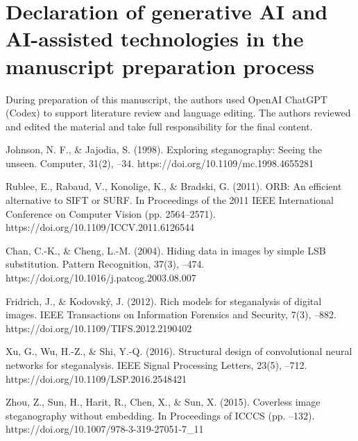 \documentclass[preprint,12pt]{elsarticle}
\theoremstyle{plain}
\providecommand{\DIFaddtex}[1]{{\protect\color{blue} \sf #1}} %
\providecommand{\DIFdeltex}[1]{{\protect\color{red} \scriptsize #1}} %
\providecommand{\DIFaddbegin}{} %
\providecommand{\DIFaddend}{} %
\providecommand{\DIFdelbegin}{} %
\providecommand{\DIFdelend}{} %
\providecommand{\DIFadd}[1]{\texorpdfstring{\DIFaddtex{#1}}{#1}} %
\providecommand{\DIFdel}[1]{\texorpdfstring{\DIFdeltex{#1}}{}} %
\providecommand{\DIFscaledelfig}{0.5}
\newlength{\DIFdelgraphicswidth} %
\newlength{\DIFdelgraphicsheight} %
\providecommand{\DIFaddincludegraphics}[2][]{{\color{blue}\fbox{\DIFOincludegraphics[#1]{#2}}}} %
\providecommand{\DIFdelincludegraphics}[2][]{%
\sbox{\DIFdelgraphicsbox}{\DIFOincludegraphics[#1]{#2}}%
\settoboxwidth{\DIFdelgraphicswidth}{\DIFdelgraphicsbox} %
\settoboxtotalheight{\DIFdelgraphicsheight}{\DIFdelgraphicsbox} %
\scalebox{\DIFscaledelfig}{%
\parbox[b]{\DIFdelgraphicswidth}{\usebox{\DIFdelgraphicsbox}\\[-\baselineskip] \rule{\DIFdelgraphicswidth}{0em}}\llap{\resizebox{\DIFdelgraphicswidth}{\DIFdelgraphicsheight}{%
\setlength{\unitlength}{\DIFdelgraphicswidth}%
\begin{picture}(1,1)%
\thicklines\linethickness{2pt} %
{\color[rgb]{1,0,0}\put(0,0){\framebox(1,1){}}}%
{\color[rgb]{1,0,0}\put(0,0){\line( 1,1){1}}}%
{\color[rgb]{1,0,0}\put(0,1){\line(1,-1){1}}}%
\end{picture}%
}\hspace*{3pt}}} %
} %
\DeclareRobustCommand{\DIFaddbegin}{\DIFOaddbegin \let\includegraphics\DIFaddincludegraphics} %
\DeclareRobustCommand{\DIFaddend}{\DIFOaddend \let\includegraphics\DIFOincludegraphics} %
\DeclareRobustCommand{\DIFdelbegin}{\DIFOdelbegin \let\includegraphics\DIFdelincludegraphics} %
\DeclareRobustCommand{\DIFdelend}{\DIFOaddend \let\includegraphics\DIFOincludegraphics} %
\renewcommand{\DIFdel}[1]{}
\renewcommand{\DIFdelincludegraphics}[2][]{}
\begin{document}
\section*{Declaration of generative AI and AI-assisted technologies in the manuscript preparation process}
During preparation of this manuscript, the authors used OpenAI ChatGPT (Codex) to support literature review \DIFdelbegin \DIFdel{, organize reviewer-driven revisions, and refine manuscript structure and language }\DIFdelend \DIFaddbegin \DIFadd{and language editing}\DIFaddend . The authors reviewed and edited the material and take full responsibility for the final content.
\begin{thebibliography}{28}

Johnson, N. F., \& Jajodia, S. (1998). Exploring steganography: Seeing the unseen. Computer, 31(2), \DIFdelbegin \DIFdel{26â€“34. }\DIFdelend \DIFaddbegin \DIFadd{26--34. }\DIFaddend https://doi.org/10.1109/mc.1998.4655281

Rublee, E., Rabaud, V., Konolige, K., \& Bradski, G. (2011). ORB: An efficient alternative to SIFT or SURF. In Proceedings of the 2011 IEEE International Conference on Computer Vision (pp. 2564--2571). https://doi.org/10.1109/ICCV.2011.6126544

Chan, C.-K., \& Cheng, L.-M. (2004). Hiding data in images by simple LSB substitution. Pattern Recognition, 37(3), \DIFdelbegin \DIFdel{469â€“474. }\DIFdelend \DIFaddbegin \DIFadd{469--474. }\DIFaddend https://doi.org/10.1016/j.patcog.2003.08.007

Fridrich, J., \& \DIFdelbegin \DIFdel{KodovskÃ}\DIFdelend \DIFaddbegin \DIFadd{Kodovský}\DIFaddend , J. (2012). Rich models for steganalysis of digital images. IEEE Transactions on Information Forensics and Security, 7(3), \DIFdelbegin \DIFdel{868â€“882. }\DIFdelend \DIFaddbegin \DIFadd{868--882. }\DIFaddend https://doi.org/10.1109/TIFS.2012.2190402

Xu, G., Wu, H.-Z., \& Shi, Y.-Q. (2016). Structural design of convolutional neural networks for steganalysis. IEEE Signal Processing Letters, 23(5), \DIFdelbegin \DIFdel{708â€“712. }\DIFdelend \DIFaddbegin \DIFadd{708--712. }\DIFaddend https://doi.org/10.1109/LSP.2016.2548421

Zhou, Z., Sun, H., Harit, R., Chen, X., \& Sun, X. (2015). Coverless image steganography without embedding. In Proceedings of ICCCS (pp. \DIFdelbegin \DIFdel{123â€“132}\DIFdelend \DIFaddbegin \DIFadd{123--132}\DIFaddend ). https://doi.org/10.1007/978-3-319-27051-7\_11


\end{thebibliography}
\end{document}
